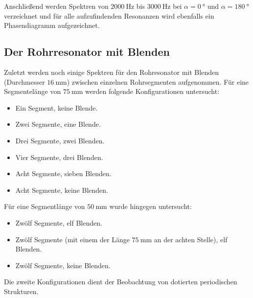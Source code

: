 \documentclass[../main.tex]{subfiles}
\begin{document}
    Anschließend werden Spektren von $\SI{2000}{\hertz}$ bis $\SI{3000}{\hertz}$ bei $\alpha=\SI{0}{\degree}$ und $\alpha=\SI{180}{\degree}$ verzeichnet und für alle aufzufindenden Resonanzen wird ebenfalls ein Phasendiagramm aufgezeichnet.
    
\subsection{Der Rohrresonator mit Blenden}
    Zuletzt werden noch einige Spektren für den Rohresonator mit Blenden (Durchmesser $\SI{16}{\milli\metre}$) zwischen einzelnen Rohrsegmenten aufgenommen. Für eine Segmentelänge von $\SI{75}{\milli\metre}$ werden folgende Konfigurationen untersucht:
    \begin{itemize}
        \item Ein Segment, keine Blende.
        \item Zwei Segmente, eine Blende. 
        \item Drei Segmente, zwei Blenden.
        \item Vier Segmente, drei Blenden.
        \item Acht Segmente, sieben Blenden.
        \item Acht Segmente, keine Blenden.
    \end{itemize}

    Für eine Segmentlänge von $\SI{50}{\milli\metre}$ wurde hingegen untersucht:
    \begin{itemize}
        \item Zwölf Segmente, elf Blenden.
        \item Zwölf Segmente (mit einem der Länge $\SI{75}{\milli\metre}$ an der achten Stelle), elf Blenden.
        \item Zwölf Segmente, keine Blenden.
    \end{itemize}
    
    Die zweite Konfigurationen dient der Beobachtung von dotierten periodischen Strukturen.
\end{document}
